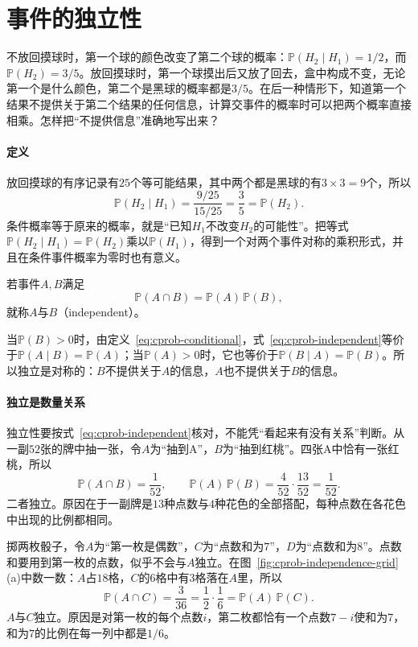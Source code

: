 \section{事件的独立性}
\label{sec:cprob-independence}

不放回摸球时，第一个球的颜色改变了第二个球的概率：$\mathbb{P}(H_2\mid H_1)=1/2$，而$\mathbb{P}(H_2)=3/5$。放回摸球时，第一个球摸出后又放了回去，盒中构成不变，无论第一个是什么颜色，第二个是黑球的概率都是$3/5$。在后一种情形下，知道第一个结果不提供关于第二个结果的任何信息，计算交事件的概率时可以把两个概率直接相乘。怎样把“不提供信息”准确地写出来？

\paragraph{定义}
放回摸球的有序记录有$25$个等可能结果，其中两个都是黑球的有$3\times3=9$个，所以
\[
 \mathbb{P}(H_2\mid H_1)=\frac{9/25}{15/25}=\frac35=\mathbb{P}(H_2).
\]
条件概率等于原来的概率，就是“已知$H_1$不改变$H_2$的可能性”。把等式$\mathbb{P}(H_2\mid H_1)=\mathbb{P}(H_2)$乘以$\mathbb{P}(H_1)$，得到一个对两个事件对称的乘积形式，并且在条件事件概率为零时也有意义。

\begin{definition}[两个事件的独立]
\label{def:cprob-independent}
若事件$A,B$满足
\begin{equation}
 \mathbb{P}(A\cap B)=\mathbb{P}(A)\,\mathbb{P}(B),
 \label{eq:cprob-independent}
\end{equation}
就称$A$与$B$（independent）。
\end{definition}

当$\mathbb{P}(B)>0$时，由定义~\eqref{eq:cprob-conditional}，式~\eqref{eq:cprob-independent}等价于$\mathbb{P}(A\mid B)=\mathbb{P}(A)$；当$\mathbb{P}(A)>0$时，它也等价于$\mathbb{P}(B\mid A)=\mathbb{P}(B)$。所以独立是对称的：$B$不提供关于$A$的信息，$A$也不提供关于$B$的信息。

\paragraph{独立是数量关系}
独立性要按式~\eqref{eq:cprob-independent}核对，不能凭“看起来有没有关系”判断。从一副$52$张的牌中抽一张，令$A$为“抽到A”，$B$为“抽到红桃”。四张A中恰有一张红桃，所以
\[
 \mathbb{P}(A\cap B)=\frac{1}{52},\qquad
 \mathbb{P}(A)\,\mathbb{P}(B)=\frac{4}{52}\cdot\frac{13}{52}=\frac{1}{52}.
\]
二者独立。原因在于一副牌是$13$种点数与$4$种花色的全部搭配，每种点数在各花色中出现的比例都相同。

掷两枚骰子，令$A$为“第一枚是偶数”，$C$为“点数和为$7$”，$D$为“点数和为$8$”。点数和要用到第一枚的点数，似乎不会与$A$独立。在图~\ref{fig:cprob-independence-grid}(a)中数一数：$A$占$18$格，$C$的$6$格中有$3$格落在$A$里，所以
\[
 \mathbb{P}(A\cap C)=\frac{3}{36}=\frac12\cdot\frac16=\mathbb{P}(A)\,\mathbb{P}(C).
\]
$A$与$C$独立。原因是对第一枚的每个点数$i$，第二枚都恰有一个点数$7-i$使和为$7$，和为$7$的比例在每一列中都是$1/6$。

